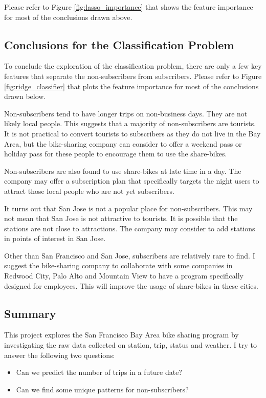 \documentclass[a4paper]{article}
\begin{document}
	Please refer to Figure \ref{fig:lasso_importance} that shows the feature importance for most of the conclusions drawn above.
	
	\subsection{Conclusions for the Classification Problem}
	To conclude the exploration of the classification problem, there are only a few key features that separate the non-subscribers from subscribers. Please refer to Figure \ref{fig:ridge_classifier} that plots the feature importance for most of the conclusions drawn below.
	
	Non-subscribers tend to have longer trips on non-business days. They are not likely local people. This suggests that a majority of non-subscribers are tourists. It is not practical to convert tourists to subscribers as they do not live in the Bay Area, but the bike-sharing company can consider to offer a weekend pass or holiday pass for these people to encourage them to use the share-bikes.
	
	Non-subscribers are also found to use share-bikes at late time in a day. The company may offer a subscription plan that specifically targets the night users to attract those local people who are not yet subscribers.
	
	It turns out that San Jose is not a popular place for non-subscribers. This may not mean that San Jose is not attractive to tourists. It is possible that the stations are not close to attractions. The company may consider to add stations in points of interest in San Jose.
	
	Other than San Francisco and San Jose, subscribers are relatively rare to find. I suggest the bike-sharing company to collaborate with some companies in Redwood City, Palo Alto and Mountain View to have a program specifically designed for employees. This will improve the usage of share-bikes in these cities.
	
	\subsection{Summary}
	
	This project explores the San Francisco Bay Area bike sharing program by investigating the raw data collected on station, trip, status and weather. I try to answer the following two questions: 
	
	\begin{itemize}
		\item Can we predict the number of trips in a future date?
		\item Can we find some unique patterns for non-subscribers?
	\end{itemize}
		
\end{document}
